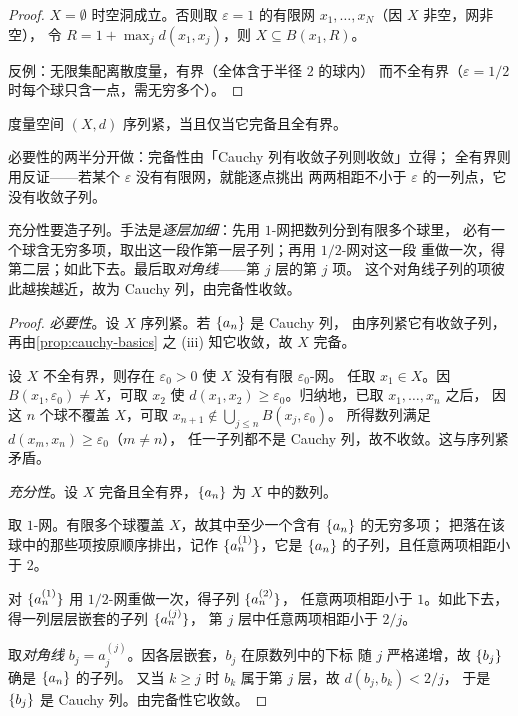 \begin{proof}
  \(X = \emptyset\) 时空洞成立。否则取 \(\varepsilon=1\) 的有限网
  \(x_{1},\dots,x_{N}\)（因 \(X\) 非空，网非空），
  令 \(R = 1 + \max_{j} d(x_{1},x_{j})\)，则 \(X \subseteq B(x_{1},R)\)。

  反例：无限集配离散度量，有界（全体含于半径 \(2\) 的球内）
  而不全有界（\(\varepsilon = 1/2\) 时每个球只含一点，需无穷多个）。
\end{proof}

\begin{theorem}
  \label{thm:seq-compact-iff}
  度量空间 \((X,d)\) 序列紧，当且仅当它完备且全有界。
\end{theorem}

\begin{strategy}
  必要性的两半分开做：完备性由「Cauchy 列有收敛子列则收敛」立得；
  全有界则用反证——若某个 \(\varepsilon\) 没有有限网，就能逐点挑出
  两两相距不小于 \(\varepsilon\) 的一列点，它没有收敛子列。

  充分性要造子列。手法是\emph{逐层加细}：先用 \(1\)-网把数列分到有限多个球里，
  必有一个球含无穷多项，取出这一段作第一层子列；再用 \(1/2\)-网对这一段
  重做一次，得第二层；如此下去。最后取\emph{对角线}——第 \(j\) 层的第 \(j\) 项。
  这个对角线子列的项彼此越挨越近，故为 Cauchy 列，由完备性收敛。
\end{strategy}

\begin{proof}
  \emph{必要性}。设 \(X\) 序列紧。若 \(\{a_{n}\}\) 是 Cauchy 列，
  由序列紧它有收敛子列，再由\cref{prop:cauchy-basics} 之 (iii)
  知它收敛，故 \(X\) 完备。

  设 \(X\) 不全有界，则存在 \(\varepsilon_{0}>0\) 使 \(X\) 没有有限 \(\varepsilon_{0}\)-网。
  任取 \(x_{1} \in X\)。因 \(B(x_{1},\varepsilon_{0}) \neq X\)，可取 \(x_{2}\) 使
  \(d(x_{1},x_{2}) \ge \varepsilon_{0}\)。归纳地，已取 \(x_{1},\dots,x_{n}\) 之后，
  因这 \(n\) 个球不覆盖 \(X\)，可取 \(x_{n+1} \notin \bigcup_{j \le n} B(x_{j},\varepsilon_{0})\)。
  所得数列满足 \(d(x_{m},x_{n}) \ge \varepsilon_{0}\)（\(m \neq n\)），
  任一子列都不是 Cauchy 列，故不收敛。这与序列紧矛盾。

  \emph{充分性}。设 \(X\) 完备且全有界，\(\{a_{n}\}\) 为 \(X\) 中的数列。

  取 \(1\)-网。有限多个球覆盖 \(X\)，故其中至少一个含有 \(\{a_{n}\}\) 的无穷多项；
  把落在该球中的那些项按原顺序排出，记作 \(\{a^{(1)}_{n}\}\)，它是 \(\{a_{n}\}\)
  的子列，且任意两项相距小于 \(2\)。

  对 \(\{a^{(1)}_{n}\}\) 用 \(1/2\)-网重做一次，得子列 \(\{a^{(2)}_{n}\}\)，
  任意两项相距小于 \(1\)。如此下去，得一列层层嵌套的子列 \(\{a^{(j)}_{n}\}\)，
  第 \(j\) 层中任意两项相距小于 \(2/j\)。

  取\emph{对角线} \(b_{j} = a^{(j)}_{j}\)。因各层嵌套，\(b_{j}\) 在原数列中的下标
  随 \(j\) 严格递增，故 \(\{b_{j}\}\) 确是 \(\{a_{n}\}\) 的子列。
  又当 \(k \ge j\) 时 \(b_{k}\) 属于第 \(j\) 层，故 \(d(b_{j},b_{k}) < 2/j\)，
  于是 \(\{b_{j}\}\) 是 Cauchy 列。由完备性它收敛。
\end{proof}

